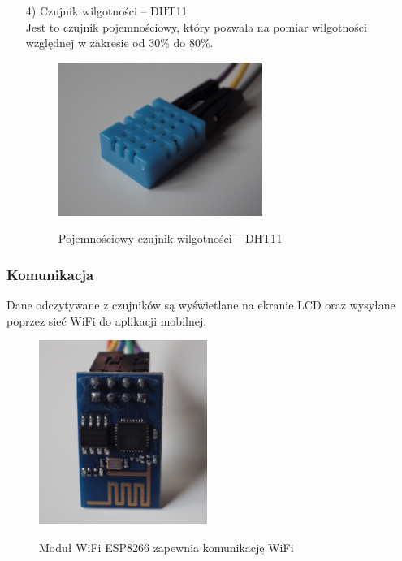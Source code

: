 \documentclass[12pt,a4paper]{article}
\begin{document}
\begin{enumerate}
	\item[4)]Czujnik wilgotności -- DHT11\\
	Jest to czujnik pojemnościowy, który pozwala na pomiar wilgotności względnej w zakresie od 30\% do 80\%.

\begin{figure}[!h]	
\centering
	\includegraphics[height =50mm]{DHT11.jpg}
	\label{DHT11}
	\caption{Pojemnościowy czujnik wilgotności -- DHT11}
\end{figure}		
	
\end{enumerate}
\subsubsection{Komunikacja}
Dane odczytywane z czujników są wyświetlane na ekranie LCD oraz wysyłane poprzez sieć WiFi do aplikacji mobilnej.
\begin{figure}[!h]	
\centering
	\includegraphics[height =60mm]{ESP8266.jpg}
	\label{ESP8266}
	\caption{Moduł WiFi ESP8266 zapewnia komunikację WiFi}
\end{figure}	
\end{document}

